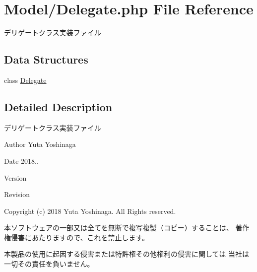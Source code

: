 \hypertarget{_delegate_8php}{}\section{Model/\+Delegate.php File Reference}
\label{_delegate_8php}


デリゲートクラス実装ファイル  


\subsection*{Data Structures}
\begin{DoxyCompactItemize}
\item 
class \hyperlink{class_delegate}{Delegate}
\end{DoxyCompactItemize}


\subsection{Detailed Description}
デリゲートクラス実装ファイル 

\begin{DoxyAuthor}{Author}
Yuta Yoshinaga 
\end{DoxyAuthor}
\begin{DoxyDate}{Date}
2018.. 
\end{DoxyDate}
\begin{DoxyParagraph}{Version}

\end{DoxyParagraph}
\begin{DoxyParagraph}{Revision}

\end{DoxyParagraph}


Copyright (c) 2018 Yuta Yoshinaga. All Rights reserved.


\begin{DoxyItemize}
\item 本ソフトウェアの一部又は全てを無断で複写複製（コピー）することは、 著作権侵害にあたりますので、これを禁止します。
\item 本製品の使用に起因する侵害または特許権その他権利の侵害に関しては 当社は一切その責任を負いません。 
\end{DoxyItemize}